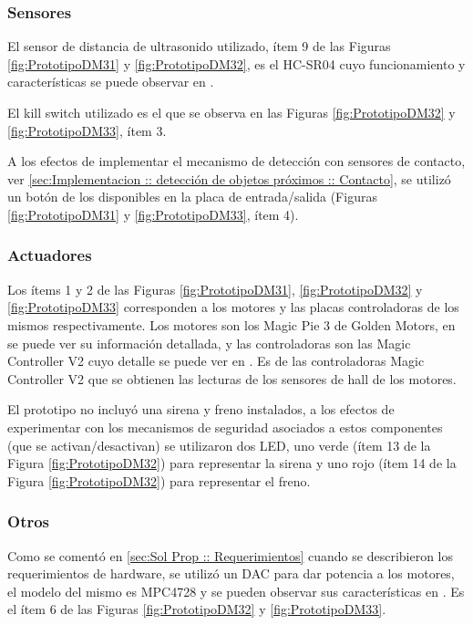 \documentclass[withindex,glossary]{cam-thesis}
\begin{document}
\subsubsection{Sensores}
El sensor de distancia de ultrasonido utilizado, ítem 9 de las Figuras \ref{fig:PrototipoDM31} y \ref{fig:PrototipoDM32}, es el HC-SR04 cuyo funcionamiento y características se puede observar en \cite{HCSR04}.

El kill switch utilizado es el que se observa en las Figuras \ref{fig:PrototipoDM32} y \ref{fig:PrototipoDM33}, ítem 3.

A los efectos de implementar el mecanismo de detección con sensores de contacto, ver \ref{sec:Implementacion :: detección de objetos próximos :: Contacto}, se utilizó un botón de los disponibles en la placa de entrada/salida (Figuras \ref{fig:PrototipoDM31} y \ref{fig:PrototipoDM33}, ítem 4).

\subsubsection{Actuadores} \label{sec: Implementación :: Plataforma Utilizada - Hardware - Actuadores}
Los ítems 1 y 2 de las Figuras \ref{fig:PrototipoDM31}, \ref{fig:PrototipoDM32} y \ref{fig:PrototipoDM33} corresponden a los motores y las placas controladoras de los mismos respectivamente. Los motores son los Magic Pie 3 de Golden Motors, en \cite{MagicPie3} se puede ver su información detallada, y las controladoras son las Magic Controller V2 cuyo detalle se puede ver en \cite{MagicControllerV2}. Es de las controladoras Magic Controller V2 que se obtienen las lecturas de los sensores de hall de los motores.

El prototipo no incluyó una sirena y freno instalados, a los efectos de experimentar con los mecanismos de seguridad asociados a estos componentes (que se activan/desactivan) se utilizaron dos LED, uno verde (ítem 13 de la Figura \ref{fig:PrototipoDM32}) para representar la sirena y uno rojo (ítem 14 de la Figura \ref{fig:PrototipoDM32}) para representar el freno.

\subsubsection{Otros} \label{sec: Implementación :: Plataforma Utilizada - Hardware - Otros}
Como se comentó en \ref{sec:Sol Prop :: Requerimientos} cuando se describieron los requerimientos de hardware, se utilizó un DAC para dar potencia a los motores, el modelo del mismo es MPC4728 y se pueden observar sus características en \cite{MPC4728}. Es el ítem 6 de las Figuras \ref{fig:PrototipoDM32} y \ref{fig:PrototipoDM33}.
\end{document}

